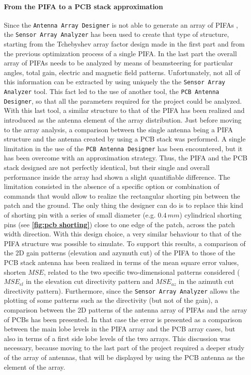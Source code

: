 \documentclass[12pt,a4paper]{article}
\begin{document}
{	\paragraph{\selectfont\color{Turquoise}From the PIFA to a PCB stack approximation}
Since the \texttt{\color{Mahogany}Antenna Array Designer} is not able to generate an array of PIFAs , the \texttt{\color{Mahogany}Sensor Array Analyzer} has been used to create that type of structure, starting from the Tchebyshev array factor design made in the first part and from the previous optimization process of a single PIFA. In the last part the overall array of PIFAs needs to be analyzed by means of beamsteering for particular angles, total gain, electric and magnetic field patterns. Unfortunately, not all of this information can be extracted by using uniquely the the \texttt{\color{Mahogany}Sensor Array Analyzer} tool. This fact led to the use of another tool, the \texttt{\color{Mahogany}PCB Antenna Designer}, so that all the parameters required for the project could be analyzed. With this last tool, a similar structure to that of the PIFA has been realized and introduced as the antenna element of the array distribution. Just before moving to the array analysis, a comparison between the single antenna being a PIFA structure and the antenna created by using a PCB stack was performed. A single limitation in the use of the \texttt{\color{Mahogany}PCB Antenna Designer} has been encountered, but it has been overcome with an approximation strategy. Thus, the PIFA and the PCB stack designed are not perfectly identical, but their single and overall performance inside the array had shown a slight quantifiable difference. The limitation consisted in the absence of a specific option or combination of commands that would allow to realize the rectangular shorting pin between the patch and the ground. The only thing the designer can do is to replace this kind of shorting pin with a series of small diameter (e.g. $0.4\,mm$) cylindrical shorting pins (see \textbf{\cref{fig:pcb shorting}}) close to one edge of the patch, across the patch width direction. With this design choice, a very similar behaviour to that of the PIFA structure was possible to simulate. To support this results, a comparison of the 2D gain patterns (elevation and azymuth cut) of the PIFA to those of the PCB stack antenna has been realized in terms of the mean square error values, shorten $MSE$, related to the two specific two-dimensional patterns considered ($MSE_{el}$ in the elevation cut directivity pattern and $MSE_{az}$ in the azimuth cut directivity pattern). Furthermore, since the \texttt{\color{Mahogany}Sensor Array Analyzer} allows the plotting of some patterns such as the directivity (but not of the gain), a comparison between the 2D patterns of the antenna array of PIFAs and the array of PCBs has been presented. In that case the error is presented as a comparison between the main lobe levels in the PIFA array and the PCB array cases, but also in terms of a first side lobe levels of the two arrays. This discussion was necessary, because moving to the last part of the project required a deeper study of the array of antennas, that will be displayed by using the PCB antenna as the element of the array. 
}
\end{document}
